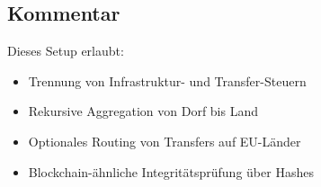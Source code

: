 \subsection{Kommentar}
Dieses Setup erlaubt:
\begin{itemize}
    \item Trennung von Infrastruktur- und Transfer-Steuern
    \item Rekursive Aggregation von Dorf bis Land
    \item Optionales Routing von Transfers auf EU-Länder
    \item Blockchain-ähnliche Integritätsprüfung über Hashes
\end{itemize}

